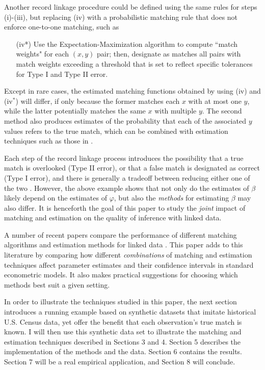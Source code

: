 \documentclass[12pt]{article}
\begin{document}
Another record linkage procedure could be defined using the same rules for steps (i)-(iii), but replacing (iv) with a probabilistic matching rule that does not enforce one-to-one matching, such as
\begin{enumerate}
\item[(iv*)]  Use the Expectation-Maximization algorithm to compute ``match weights" for each $(x,y)$ pair; then, designate as matches all pairs with match weights exceeding a threshold that is set to reflect specific tolerances for Type I and Type II error. 
\end{enumerate} 
Except in rare cases, the estimated matching functions obtained by using (iv) and (iv$^*$) will differ, if only because the former matches each $x$ with at most one $y$, while the latter potentially matches the same $x$ with multiple $y$.  The second method also produces estimates of the probability that each of the associated $y$ values refers to the true match, which can be combined with estimation techniques such as those in \cite{lahiri05}. 

Each step of the record linkage process introduces the possibility that a true match is overlooked (Type II error), or that a false match is designated as correct (Type I error), and there is generally a tradeoff between reducing either one of the two \citep{abe2019, harron2018}.  However, the above example shows that not only do the estimates of $\beta$ likely depend on the estimates of $\varphi$, but also the \textit{methods} for estimating $\beta$ may also differ.  It is henceforth the goal of this paper to study the \textit{joint} impact of matching and estimation on the quality of inference with linked data.

A number of recent papers compare the performance of different matching algorithms  \citep{bailey2017, arp2018} and estimation methods for linked data \citep{harron2014}.  This paper adds to this literature by comparing how different \textit{combinations} of matching and estimation techniques affect parameter estimates and their confidence intervals in standard econometric models.  It also makes practical suggestions for choosing which methods best suit a given setting. 

In order to illustrate the techniques studied in this paper, the next section introduces a running example based on synthetic datasets that imitate historical U.S. Census data, yet offer the benefit that each observation's true match is known.   I will then use this synthetic data set to illustrate the matching and estimation techniques described in Sections 3 and 4. Section 5 describes the implementation of the methods and the data.  Section 6 contains the results.  Section 7 will be a real empirical application, and Section 8 will conclude.
\end{document}
